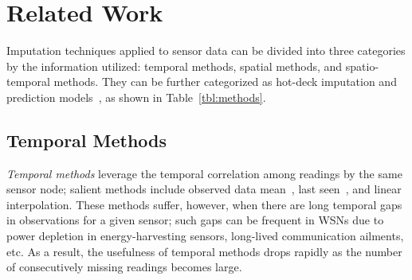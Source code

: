 \section{Related Work}\label{sec:rw}

Imputation techniques applied to sensor data can be divided into three categories by the information utilized:
temporal methods, spatial methods, 
and spatio-temporal methods. They can be further categorized as hot-deck imputation and prediction models~\cite{Garcia:KNNreview},
as shown in Table~\ref{tbl:methods}.


\subsection{Temporal Methods}
{\em Temporal methods} leverage the temporal correlation among
readings by the same sensor node; salient methods include observed
data mean~\cite{madden2005tinydb}, last
seen~\cite{Granger:lastseen}, and linear interpolation. %
%
These methods
suffer, however, when there are long temporal gaps in observations for a given
sensor; such gaps can be frequent in WSNs due to power depletion in
energy-harvesting sensors, long-lived communication ailments, etc.  
As a result, the usefulness of temporal methods drops rapidly as the number of consecutively missing readings
becomes large.

